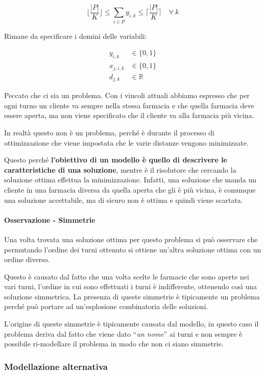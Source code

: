 $$
\bigg\lfloor \frac{|P|}{K} \bigg\rfloor \leq \sum\limits_{i \in P} y_{i,k} \leq  \bigg\lceil \frac{|P|}{K} \bigg\rceil \quad \forall \: k
$$

\noindent Rimane da specificare i domini delle variabili:

\begin{align*}
	y_{i,k} &\in \{0,1\} \\
	x_{j,i,k} &\in \{0,1\} \\
	d_{j,k} &\in \mathbb{R}
\end{align*}

\noindent Peccato che ci sia un problema. Con i vincoli attuali abbiamo espresso che per ogni turno un cliente va sempre nella stessa farmacia e che quella farmacia deve essere aperta, ma non viene specificato che il cliente va alla farmacia più vicina.

In realtà questo non è un problema, perché è durante il processo di ottimizzazione che viene impostata che le varie distanze vengono minimizzate.

Questo perché \textbf{l'obiettivo di un modello è quello di descrivere le caratteristiche di una soluzione}, mentre è il risolutore che cercando la soluzione ottima effettua la minimizzazione. Infatti, una soluzione che manda un cliente in una farmacia diversa da quella aperta che gli è più vicina, è comunque una soluzione accettabile, ma di sicuro non è ottima e quindi viene scartata.

\paragraph{Osservazione - Simmetrie}

Una volta trovata una soluzione ottima per questo problema si può osservare che permutando l'ordine dei turni ottenuto si ottiene un'altra soluzione ottima con un ordine diverso.

Questo è causato dal fatto che una volta scelte le farmacie che sono aperte nei vari turni, l'ordine in cui sono effettuati i turni è indifferente, ottenendo così una soluzione simmetrica. 
La presenza di queste simmetrie è tipicamente un problema perché può portare ad un'esplosione combinatoria delle soluzioni.

L'origine di queste simmetrie è tipicamente causata dal modello, in questo caso il problema deriva dal fatto che viene dato ``\textit{un nome}'' ai turni e non sempre è possibile ri-modellare il problema in modo che non ci siano simmetrie.

\subsubsection{Modellazione alternativa}


